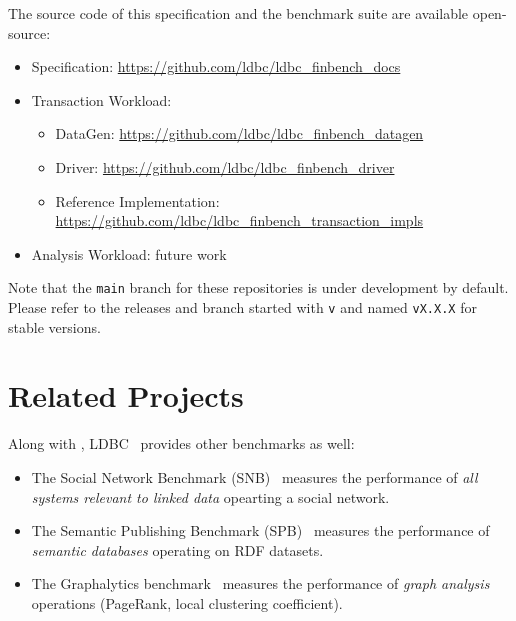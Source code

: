 The source code of this specification and the benchmark suite are available
open-source:
\begin{itemize}
    \item \ldbcfinbench Specification: \url{https://github.com/ldbc/ldbc_finbench_docs}
    \item Transaction Workload:
    \begin{itemize}
        \item \ldbcfinbench DataGen: \url{https://github.com/ldbc/ldbc_finbench_datagen}
        \item \ldbcfinbench Driver: \url{https://github.com/ldbc/ldbc_finbench_driver}
        \item \ldbcfinbench Reference Implementation: \url{https://github.com/ldbc/ldbc_finbench_transaction_impls}
    \end{itemize}
    \item Analysis Workload: future work
\end{itemize}

Note that the \texttt{main} branch for these repositories is under development by default.
Please refer to the releases and branch started with \texttt{v} and named \texttt{vX.X.X}
for stable versions.


\section{Related Projects}

Along with \ldbcfinbench, LDBC~\cite{DBLP:journals/sigmod/AnglesBLF0ENMKT14} provides other
benchmarks as well:

\begin{itemize}
    \item The Social Network Benchmark (SNB)~\cite{DBLP:journals/corr/abs-2001-02299} measures
    the performance of \emph{all systems relevant to linked data} opearting a social network.
	\item The Semantic Publishing Benchmark (SPB)~\cite{DBLP:conf/semweb/SpasicJP16} measures
    the performance of \emph{semantic databases} operating on RDF datasets.
	\item The Graphalytics benchmark~\cite{DBLP:journals/pvldb/IosupHNHPMCCSAT16} measures the
    performance of \emph{graph analysis} operations (\eg PageRank, local clustering coefficient).
\end{itemize}